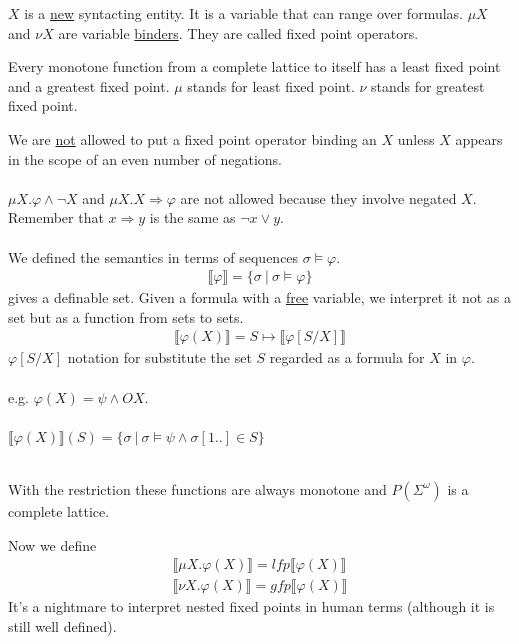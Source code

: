 \documentclass[../598comp.tex]{subfiles}
\begin{document}
$X$ is a \ul{new} syntacting entity. It is a variable that can range over
formulas. $\mu X$ and $\nu X$ are variable \ul{binders}.  They are called fixed
point operators.
\begin{recall}
  Every monotone function from a complete lattice to itself has a least fixed
  point and a greatest fixed point. $\mu$ stands for least fixed point. $\nu$
  stands for greatest fixed point.
\end{recall}
We are \ul{not} allowed to put a fixed point operator binding an $X$ unless $X$
appears in the scope of an even number of negations.
\\\\
$\mu X . \varphi \wedge \neg X$ and $\mu X. X \Rightarrow \varphi$
are not allowed because they involve negated $X$. Remember that $x \Rightarrow y
$ is the same as $\neg x \vee y$.
\\\\
We defined the semantics in terms of sequences $\sigma \models \varphi$.
\begin{gather*}
  \llbracket \varphi \rrbracket = \{ \sigma \ | \ \sigma \models \varphi \}
\end{gather*}
gives a definable set. Given a formula with a \ul{free} variable, we interpret
it not as a set but as a function from sets to sets.
\begin{gather*}
  \llbracket \varphi(X) \rrbracket = S \mapsto \llbracket \varphi [S / X] \rrbracket
\end{gather*}
$\varphi[S / X]$ notation for substitute the set $S$ regarded as a formula for
$X$ in $\varphi$.
\\\\
e.g. $\varphi(X) = \psi \wedge OX$.
\\\\
$\llbracket \varphi(X) \rrbracket(S) = \{\sigma \ | \ \sigma \models \psi \wedge
\sigma[1..] \in S\}$
\\\\
\begin{fact}
  With the restriction these functions are always monotone and
  $P(\Sigma^\omega)$ is a complete lattice.
\end{fact}
Now we define
\begin{gather*}
  \llbracket \mu X.\varphi(X) \rrbracket = lfp\llbracket \varphi(X) \rrbracket
  \\
  \llbracket \nu X. \varphi(X) \rrbracket = gfp \llbracket \varphi(X) \rrbracket
\end{gather*}
It's a nightmare to interpret nested fixed points in human terms (although it is still well defined).
\end{document}
